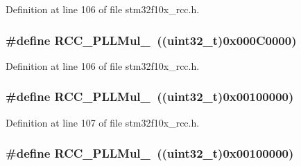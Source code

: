 Definition at line 106 of file stm32f10x\+\_\+rcc.\+h.

\subsubsection[{\texorpdfstring{R\+C\+C\+\_\+\+P\+L\+L\+Mul\+\_\+5}{RCC_PLLMul_5}}]{\setlength{\rightskip}{0pt plus 5cm}\#define R\+C\+C\+\_\+\+P\+L\+L\+Mul\+\_~(({\bf uint32\+\_\+t})0x000\+C0000)}\hypertarget{group___p_l_l__multiplication__factor_gad45e4f8edbbf4d49ded913e83e3a2d06}{}\label{group___p_l_l__multiplication__factor_gad45e4f8edbbf4d49ded913e83e3a2d06}


Definition at line 106 of file stm32f10x\+\_\+rcc.\+h.

\subsubsection[{\texorpdfstring{R\+C\+C\+\_\+\+P\+L\+L\+Mul\+\_\+6}{RCC_PLLMul_6}}]{\setlength{\rightskip}{0pt plus 5cm}\#define R\+C\+C\+\_\+\+P\+L\+L\+Mul\+\_~(({\bf uint32\+\_\+t})0x00100000)}\hypertarget{group___p_l_l__multiplication__factor_ga2eea74b9955e556b302f4d446dd68eb4}{}\label{group___p_l_l__multiplication__factor_ga2eea74b9955e556b302f4d446dd68eb4}


Definition at line 107 of file stm32f10x\+\_\+rcc.\+h.

\subsubsection[{\texorpdfstring{R\+C\+C\+\_\+\+P\+L\+L\+Mul\+\_\+6}{RCC_PLLMul_6}}]{\setlength{\rightskip}{0pt plus 5cm}\#define R\+C\+C\+\_\+\+P\+L\+L\+Mul\+\_~(({\bf uint32\+\_\+t})0x00100000)}\hypertarget{group___p_l_l__multiplication__factor_ga2eea74b9955e556b302f4d446dd68eb4}{}\label{group___p_l_l__multiplication__factor_ga2eea74b9955e556b302f4d446dd68eb4}


